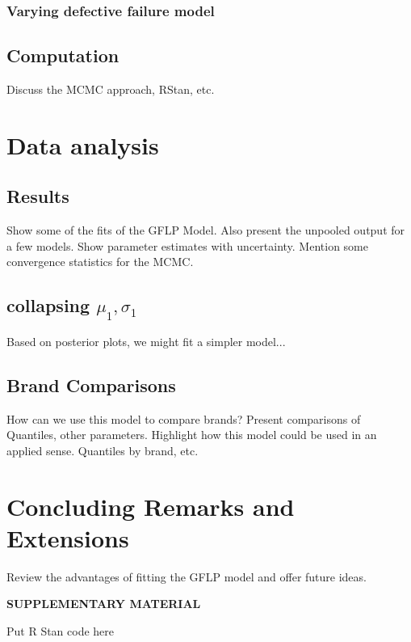 \documentclass[12pt]{article}
\begin{document}
\subsubsection{Varying defective failure model}


\subsection{Computation}
Discuss the MCMC approach, RStan, etc.

\section{Data analysis}
\subsection{Results}
Show some of the fits of the GFLP Model.  Also present the unpooled output for a few models.  Show parameter estimates with uncertainty. Mention some convergence statistics for the MCMC. 
\subsection{collapsing $\mu_1, \sigma_1$}
Based on posterior plots, we might fit a simpler model...
\subsection{Brand Comparisons}
How can we use this model to compare brands?  Present comparisons of Quantiles, other parameters.  Highlight how this model could be used in an applied sense. Quantiles by brand, etc.
\section{Concluding Remarks and Extensions}
Review the advantages of fitting the GFLP model and offer future ideas.  




    


\bigskip
\begin{center}
{\large\bf SUPPLEMENTARY MATERIAL}
\end{center}

\begin{description}

\item Put R Stan code here

\end{description}



\end{document}
